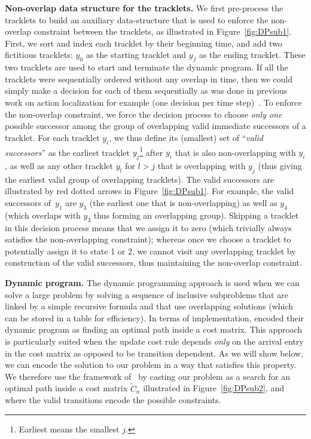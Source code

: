 \textbf{Non-overlap data structure for the tracklets.}
We first pre-process the tracklets to build an auxiliary data-structure that is used to enforce the non-overlap constraint between the tracklets, as illustrated in Figure~\ref{fig:DPsub1}.
First, we sort and index each tracklet by their beginning time, and add two fictitious tracklets: $y_0$ as the starting tracklet and $y_f$ as the ending tracklet.
These two tracklets are used to start and terminate the dynamic program.
If all the tracklets were sequentially ordered without any overlap in time, then we could simply make a decision for each of them sequentially as was done in previous work on action localization for example (one decision per time step)~\cite{Bojanowski14weakly}.
To enforce the non-overlap constraint, we force the decision process to choose \emph{only one} possible successor among the group of overlapping valid immediate successors of a tracklet. For each tracklet $y_i$, we thus define its (smallest) set of ``\emph{valid successors}'' as the earliest tracklet $y_j$\footnote{Earliest means the smallest $j$.} after $y_i$ that is also non-overlapping with $y_i$, as well as any other tracklet $y_l$ for $l > j$ that is overlapping with $y_j$ (thus giving the earliest valid group of overlapping tracklets). The valid successors are illustrated by red dotted arrows in Figure~\ref{fig:DPsub1}. For example, the valid successors of~$y_1$ are $y_3$ (the earliest one that is non-overlapping) as well as $y_4$ (which overlaps with $y_3$ thus forming an overlapping group). Skipping a tracklet in this decision process means that we assign it to zero (which trivially always satisfies the non-overlapping constraint); whereas once we choose a tracklet to potentially assign it to state 1 or 2, we cannot visit any overlapping tracklet by construction of the valid successors, thus maintaining the non-overlap constraint.

\textbf{Dynamic program.}
The dynamic programming approach is used when we can solve a large problem by solving a sequence of inclusive subproblems that are linked by a simple recursive formula and that use overlapping solutions (which can be stored in a table for efficiency).
In terms of implementation, \cite{Bojanowski14weakly} encoded their dynamic program as finding an optimal path inside a cost matrix.
This approach is particularly suited when the update cost rule depends \emph{only} on the arrival entry in the cost matrix as opposed to be transition dependent.
As we will show below, we can encode the solution to our problem in a way that satisfies this property.
We therefore use the framework of~\cite{Bojanowski14weakly} by casting our problem as a search for an optimal path inside a cost matrix $\tilde{C}_n$ illustrated in Figure~\ref{fig:DPsub2}, and where the valid transitions encode the possible constraints.

